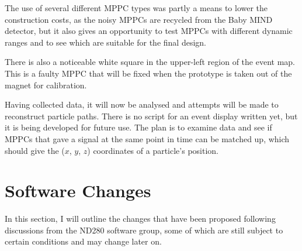 \documentclass[aps,pra,12pt,notitlepage,tightenlines]{revtex4-1}
\begin{document}
The use of several different MPPC types was partly a means to lower the construction costs, as the noisy MPPCs are recycled from the Baby MIND detector, but it also gives an opportunity to test MPPCs with different dynamic ranges and to see which are suitable for the final design.

There is also a noticeable white square in the upper-left region of the event map. This is a faulty MPPC that will be fixed when the prototype is taken out of the magnet for calibration.

Having collected data, it will now be analysed and attempts will be made to reconstruct particle paths. There is no script for an event display written yet, but it is being developed for future use. The plan is to examine data and see if MPPCs that gave a signal at the same point in time can be matched up, which should give the ($x$, $y$, $z$) coordinates of a particle's position.

\section{Software Changes}
%
%
%
%

In this section, I will outline the changes that have been proposed following discussions from the ND280 software group, some of which are still subject to certain conditions and may change later on.
\end{document}
